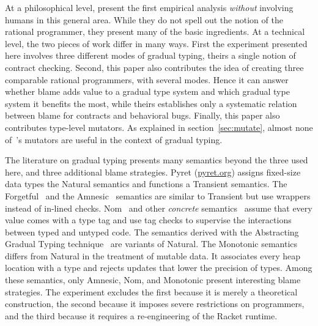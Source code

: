 \newcommand{\pyret}{\href{https://www.pyret.org}{pyret.org}}

At a philosophical level, \citet{lksfd-popl-2020} present the first empirical
analysis {\em without\/} involving humans in this general area.  While they do
not spell out the notion of the rational programmer, they present many of the
basic ingredients. At a technical level, the two pieces of work differ in many
ways.  First the experiment presented here involves three different modes of
gradual typing, theirs a single notion of contract checking.  Second, this paper
also contributes the idea of creating three comparable rational programmers,
with several modes. Hence it can answer whether blame adds value to a gradual
type system and which gradual type system it benefits the most, while theirs
establishes only a systematic relation between blame for contracts and
behavioral bugs. Finally, this paper also contributes type-level mutators. As
explained in section~\ref{sec:mutate}, almost none of~\citet{lksfd-popl-2020}'s
mutators are useful in the context of gradual typing.

The literature on gradual typing presents many semantics beyond the three used
here, and three additional blame strategies.  Pyret (\pyret{}) assigns fixed-size
data types the Natural semantics and functions a Transient semantics. The
Forgetful~\citep{cl-icfp-2017} and the Amnesic~\citep{gfd-oopsla-2019} semantics
are similar to Transient but use wrappers instead of in-lined checks.
Nom~\citep{mt-oopsla-2017} and other \emph{concrete\/}
semantics~\citep{wnlov-popl-2010, rsfbv-popl-2015, rzv-ecoop-2015,
rat-oopsla-2017} assume that every value comes with a type tag and use tag
checks to supervise the interactions between typed and untyped code.  The semantics derived with the Abstracting
Gradual Typing technique~\citep{gct-popl-2016} are variants of Natural.
The Monotonic semantics~\citep{svctg-esop-2015, rsfbv-popl-2015, sfrbcsb-popl-2014, kas-pldi-2019} 
differs from Natural in the treatment of mutable data. It 
associates every heap location with a type and rejects updates that lower the
precision of types.
Among these semantics, only Amnesic, Nom, and Monotonic present interesting blame
strategies.  The experiment excludes the first because it is 
merely a theoretical construction, the second because it imposes severe restrictions on
programmers, and the third because it requires a re-engineering of the Racket runtime. 
